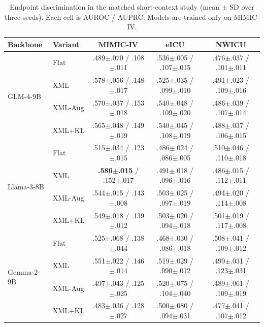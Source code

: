 \begin{table}[t]
\caption{Endpoint discrimination in the matched short-context study (mean $\pm$ SD over three seeds). Each cell is AUROC / AUPRC. Models are trained only on MIMIC-IV.}
\label{tab:multicenter_multimodel}
\centering
\scriptsize
\setlength{\tabcolsep}{4.2pt}
\begin{tabular}{llccc}
\toprule
Backbone & Variant & MIMIC-IV & eICU & NWICU \\
\midrule
\multirow{4}{*}{GLM-4-9B}
& Flat    & .489$\pm$.070 / .108$\pm$.011 & .536$\pm$.005 / .107$\pm$.015 & .476$\pm$.037 / .101$\pm$.011 \\
& XML     & .578$\pm$.056 / .148$\pm$.017 & .525$\pm$.035 / .099$\pm$.010 & .491$\pm$.023 / .109$\pm$.016 \\
& XML-Aug & .570$\pm$.037 / .153$\pm$.018 & .540$\pm$.048 / .109$\pm$.020 & .486$\pm$.039 / .107$\pm$.014 \\
& XML+KL  & .565$\pm$.048 / .149$\pm$.019 & .540$\pm$.045 / .108$\pm$.019 & .488$\pm$.037 / .106$\pm$.015 \\
\midrule
\multirow{4}{*}{Llama-3-8B}
& Flat    & .515$\pm$.034 / .123$\pm$.015 & .486$\pm$.024 / .086$\pm$.005 & .510$\pm$.046 / .110$\pm$.018 \\
& XML     & \textbf{.586$\pm$.015} / .152$\pm$.017 & .491$\pm$.018 / .096$\pm$.016 & .486$\pm$.015 / .112$\pm$.011 \\
& XML-Aug & .544$\pm$.015 / .143$\pm$.008 & .503$\pm$.025 / .097$\pm$.019 & .494$\pm$.020 / .114$\pm$.008 \\
& XML+KL  & .549$\pm$.018 / .139$\pm$.012 & .503$\pm$.020 / .094$\pm$.018 & .501$\pm$.019 / .117$\pm$.008 \\
\midrule
\multirow{4}{*}{Gemma-2-9B}
& Flat    & .525$\pm$.068 / .138$\pm$.044 & .468$\pm$.030 / .086$\pm$.018 & .508$\pm$.041 / .109$\pm$.012 \\
& XML     & .551$\pm$.022 / .146$\pm$.014 & .519$\pm$.029 / .090$\pm$.012 & .499$\pm$.031 / .123$\pm$.031 \\
& XML-Aug & .497$\pm$.043 / .125$\pm$.025 & .520$\pm$.075 / .104$\pm$.040 & .489$\pm$.061 / .109$\pm$.019 \\
& XML+KL  & .483$\pm$.036 / .128$\pm$.027 & .500$\pm$.080 / .094$\pm$.031 & .477$\pm$.041 / .107$\pm$.012 \\
\bottomrule
\end{tabular}
\end{table}
